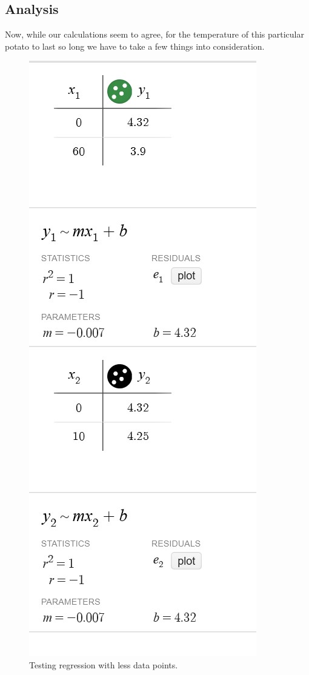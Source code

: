 \documentclass{article}
\begin{document}
\newpage
\subsection{Analysis}
Now, while our calculations seem to agree, for the temperature of this particular potato to last so long we have to take a few things into consideration.\\

\begin{figure}
    \centering
    \includegraphics[height=.5\textheight]{extra.jpg}
    \caption{Testing regression with less data points.}
\end{figure}
\end{document}
